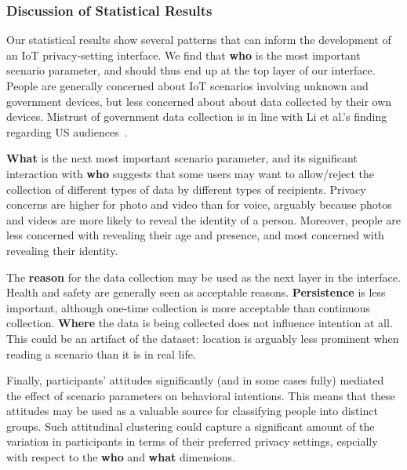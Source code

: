 \subsubsection{Discussion of Statistical Results}
Our statistical results show several patterns that can inform the development of an IoT privacy-setting interface. We find that \textbf{who} is the most important scenario parameter, and should thus end up at the top layer of our interface. People are generally concerned about IoT scenarios involving unknown and government devices, but less concerned about about data collected by their own devices. Mistrust of government data collection is in line with Li et al.'s finding regarding US audiences~\cite{li2017cross}.

\textbf{What} is the next most important scenario parameter, and its significant interaction with \textbf{who} suggests that some users may want to allow/reject the collection of different types of data by different types of recipients. Privacy concerns are higher for photo and video than for voice, arguably because photos and videos are more likely to reveal the identity of a person. Moreover, people are less concerned with revealing their age and presence, and most concerned with revealing their identity.

The \textbf{reason} for the data collection may be used as the next layer in the interface. Health and safety are generally seen as acceptable reasons. \textbf{Persistence} is less important, although one-time collection is more acceptable than continuous collection. \textbf{Where} the data is being collected does not influence intention at all. This could be an artifact of the dataset: location is arguably less prominent when reading a scenario than it is in real life.

Finally, participants' attitudes significantly (and in some cases fully) mediated the effect of scenario parameters on behavioral intentions. This means that these attitudes may be used as a valuable source for classifying people into distinct groups. Such attitudinal clustering could capture a significant amount of the variation in participants in terms of their preferred privacy settings, espcially with respect to the \textbf{who} and \textbf{what} dimensions.